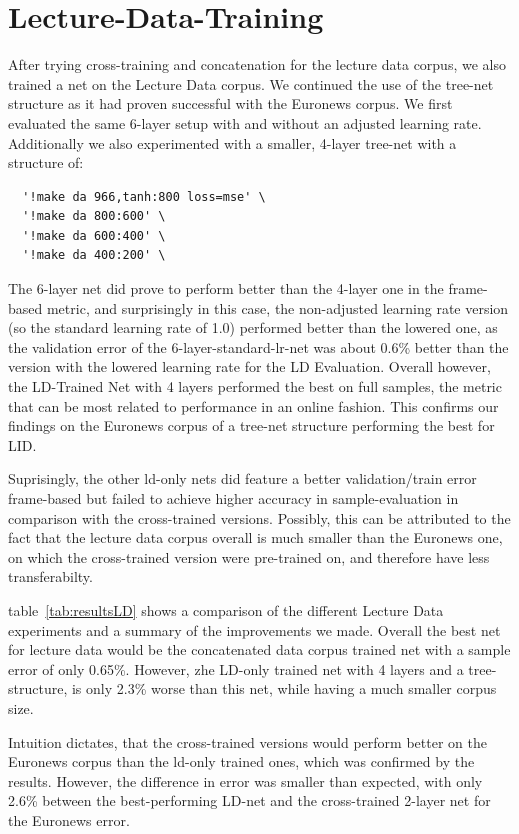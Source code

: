 \section{Lecture-Data-Training}
\label{sec:LIDNetworkLDTraining}

After trying cross-training and concatenation for the lecture data corpus, we also trained a net on the Lecture Data corpus. We continued the use of the tree-net structure as it had proven successful with the Euronews corpus. We first evaluated the same 6-layer setup with and without an adjusted learning rate. Additionally we also experimented with a smaller, 4-layer tree-net with a structure of:
\begin{verbatim}
  '!make da 966,tanh:800 loss=mse' \
  '!make da 800:600' \
  '!make da 600:400' \
  '!make da 400:200' \
\end{verbatim}

The 6-layer net did prove to perform better than the 4-layer one in the frame-based metric, and surprisingly in this case, the non-adjusted learning rate version (so the standard learning rate of 1.0) performed better than the lowered one, as the validation error of the 6-layer-standard-lr-net was about 0.6\% better than the version with the lowered learning rate for the LD Evaluation.  Overall however, the LD-Trained Net with 4 layers performed the best on full samples, the metric that can be most related to performance in an online fashion. This confirms our findings on the Euronews corpus of a tree-net structure performing the best for LID.

Suprisingly, the other ld-only nets did feature a better validation/train error frame-based but failed to achieve higher accuracy in sample-evaluation in comparison with the cross-trained versions. Possibly, this can be attributed to the fact that the lecture data corpus overall is much smaller than the Euronews one, on which the cross-trained version were pre-trained on, and therefore have less transferabilty.

table~\ref{tab:resultsLD} shows a comparison of the different Lecture Data experiments and a summary of the improvements we made. Overall the best net for lecture data would be the concatenated data corpus trained net with a sample error of only 0.65\%. However, zhe LD-only trained net with 4 layers and a tree-structure, is only 2.3\% worse than this net, while having a much smaller corpus size. 

Intuition dictates, that the cross-trained versions would perform better on the Euronews corpus than the ld-only trained ones, which was confirmed by the results. However, the difference in error was smaller than expected, with only 2.6\% between the best-performing LD-net and the cross-trained 2-layer net for the Euronews error.



